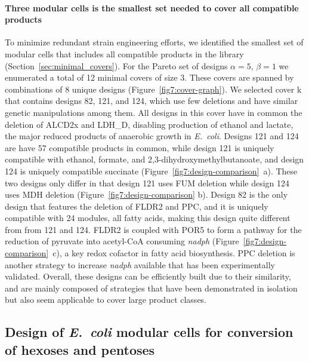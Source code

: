 \documentclass[12pt]{article}
\begin{document}
{\paragraph{Three modular cells is the smallest set needed to cover all compatible products}
To minimize redundant strain engineering efforts, we identified the smallest set of modular cells that includes all compatible products in the library (Section~\ref{sec:minimal_covers}).
For the Pareto set of designs $\alpha=5,\,\beta=1$ we  enumerated a total of 12 minimal covers of size 3.
These covers are spanned by combinations of 8 unique designs (Figure~\ref{fig7:cover-graph}).
We selected cover k that contains designs 82, 121, and 124, which use few deletions and have similar genetic manipulations among them.
All designs in this cover have in common the deletion of ALCD2x and LDH\_D, disabling production of ethanol and lactate, the major reduced products of anaerobic growth in \textit{E.~coli}.
Designs 121 and 124 are have 57 compatible products in common, while design 121 is uniquely compatible with ethanol, formate, and 2,3-dihydroxymethylbutanoate, and design 124 is uniquely compatible succinate (Figure~\ref{fig7:design-comparison}~a).
These two designs only differ in that design 121 uses FUM deletion while design 124 uses MDH deletion (Figure~\ref{fig7:design-comparison} b).
Design 82 is the only design that features the deletion of FLDR2 and PPC, and it is uniquely compatible with 24 modules, all fatty acids, making this design quite different from from 121 and 124.
FLDR2 is coupled with POR5 to form a pathway for the reduction of pyruvate into acetyl-CoA consuming \textit{nadph} (Figure~\ref{fig7:design-comparison}~c), a key redox cofactor in fatty acid biosynthesis.
PPC deletion is another strategy to increase \textit{nadph} available that has been experimentally validated. \citep{chemler2010}
Overall, these designs can be efficiently built due to their similarity,  and are mainly composed of strategies that have been demonstrated in isolation but also seem applicable to cover large product classes.


\subsection{Design of \textit{E.~coli} modular cells for conversion of hexoses and pentoses}
}
\end{document}
